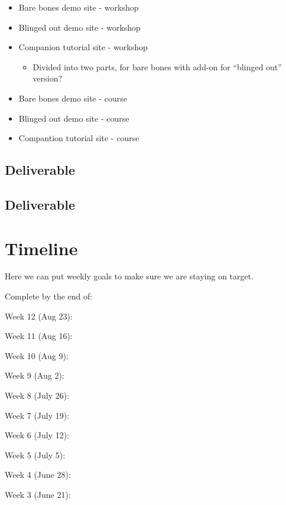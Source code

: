 \documentclass[]{book}
\providecommand{\tightlist}{%
  \setlength{\itemsep}{0pt}\setlength{\parskip}{0pt}}
\begin{document}
\begin{itemize}
\tightlist
\item
  Bare bones demo site - workshop
\item
  Blinged out demo site - workshop
\item
  Companion tutorial site - workshop

  \begin{itemize}
  \tightlist
  \item
    Divided into two parts, for bare bones with add-on for ``blinged out'' version?
  \end{itemize}
\item
  Bare bones demo site - course
\item
  Blinged out demo site - course
\item
  Compantion tutorial site - course
\end{itemize}

\hypertarget{deliverable}{%
\section{Deliverable}\label{deliverable}}

\hypertarget{deliverable-1}{%
\section{Deliverable}\label{deliverable-1}}

\hypertarget{timeline}{%
\chapter{Timeline}\label{timeline}}

Here we can put weekly goals to make sure we are staying on target.

Complete by the end of:

Week 12 (Aug 23):

Week 11 (Aug 16):

Week 10 (Aug 9):

Week 9 (Aug 2):

Week 8 (July 26):

Week 7 (July 19):

Week 6 (July 12):

Week 5 (July 5):

Week 4 (June 28):

Week 3 (June 21):


\end{document}
